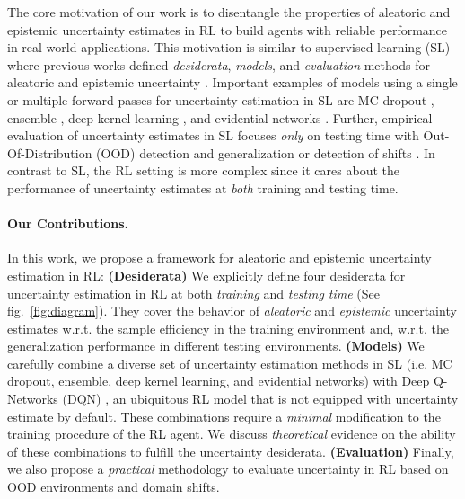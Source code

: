 The core motivation of our work is to disentangle the properties of aleatoric and epistemic uncertainty estimates in RL to build agents with reliable performance in real-world applications. This motivation is similar to supervised learning (SL) where previous works defined \emph{desiderata}, \emph{models}, and \emph{evaluation} methods for aleatoric and epistemic uncertainty \cite{uncertainty-deep-learning, review-uncertainty-dl, dataset-shift, robustness-uncertainty-dirichlet}. Important examples of models using a single or multiple forward passes for uncertainty estimation in SL are MC dropout \cite{dropout}, ensemble \cite{ensembles, hyper-ensembles, batch-ensembles}, deep kernel learning \cite{simple-baseline-uncertainty, due, duq, uceloss}, and evidential networks \cite{charpentier2020, PriorNetworks, natpn, evidential-regression}. Further, empirical evaluation of uncertainty estimates in SL focuses \emph{only} on testing time with Out-Of-Distribution (OOD) detection and generalization or detection of shifts \citep{dataset-shift, shifts-dataset}. In contrast to SL, the RL setting is more complex since it cares about the performance of uncertainty estimates at \emph{both} training and testing time.

\paragraph{Our Contributions.} In this work, we propose a framework for aleatoric and epistemic uncertainty estimation in RL: \textbf{(Desiderata)} We explicitly define four desiderata for uncertainty estimation in RL at both \emph{training} and \emph{testing time} (See fig.~\ref{fig:diagram}). They cover the behavior of \emph{aleatoric} and \emph{epistemic} uncertainty estimates w.r.t. the sample efficiency in the training environment and, w.r.t. the generalization performance in different testing environments. \textbf{(Models)} We carefully combine a diverse set of uncertainty estimation methods in SL (i.e. MC dropout, ensemble, deep kernel learning, and evidential networks) with Deep Q-Networks (DQN) \cite{dqn}, an ubiquitous RL model that is not equipped with uncertainty estimate by default. These combinations require a \emph{minimal} modification to the training procedure of the RL agent. We discuss \emph{theoretical} evidence on the ability of these combinations to fulfill the uncertainty desiderata. \textbf{(Evaluation)} Finally, we also propose a \emph{practical} methodology to evaluate uncertainty in RL based on OOD environments and domain shifts.
